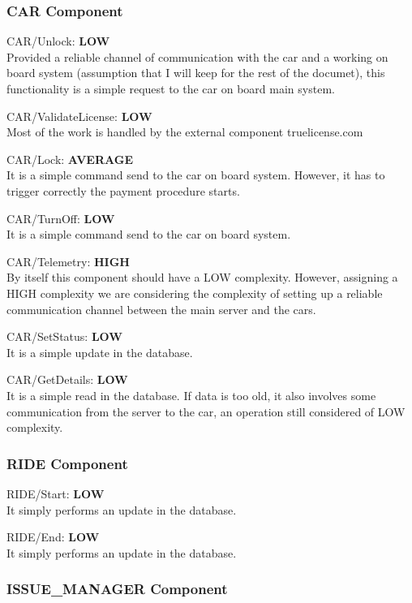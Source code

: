 \documentclass[11pt]{article} %
\newcommand{\extInput}[3]{ #1:  \textbf{#2} \\ #3  }
\begin{document}
\subsubsection{CAR Component}

\begin{description}
	\item \extInput
		{CAR/Unlock}
		{LOW}
		{Provided a reliable channel of communication with the car and a working on board system (assumption that I will keep for the rest of the documet), this functionality is a simple request to the car on board main system.}
	\item \extInput
		{CAR/ValidateLicense}
		{LOW}
		{Most of the work is handled by the external component truelicense.com}
	\item \extInput
		{CAR/Lock}
		{AVERAGE}
		{It is a simple command send to the car on board system. However, it has to trigger correctly the payment procedure starts.}
	\item \extInput
		{CAR/TurnOff}
		{LOW}
		{It is a simple command send to the car on board system.}
	\item \extInput
		{CAR/Telemetry}
		{HIGH}
		{By itself this component should have a LOW complexity. However, assigning a HIGH complexity we are considering the complexity of setting up a reliable communication channel between the main server and the cars.}
	\item \extInput
		{CAR/SetStatus}
		{LOW}
		{It is a simple update in the database.}
	\item \extInput
		{CAR/GetDetails}
		{LOW}
		{It is a simple read in the database. If data is too old, it also involves some communication from the server to the car, an operation still considered of LOW complexity.}
\end{description}

\subsubsection{RIDE Component}

\begin{description}
	\item \extInput
		{RIDE/Start}
		{LOW}
		{It simply performs an update in the database.}
	\item \extInput
		{RIDE/End}
		{LOW}
		{It simply performs an update in the database.}
\end{description}

\subsubsection{ISSUE\_MANAGER Component}
\end{document}
